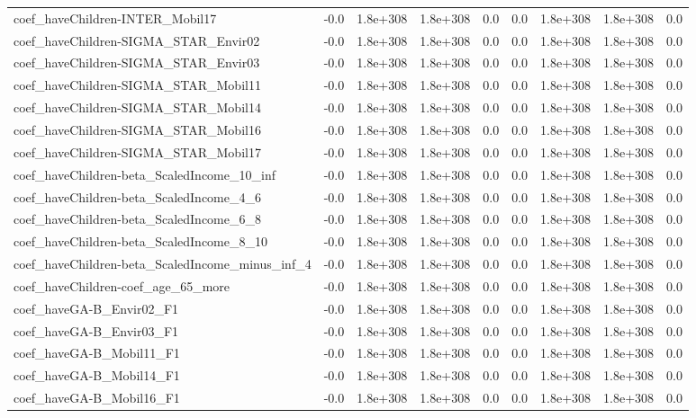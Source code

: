 \begin{tabular}{lrrrrrrrr}
coef_haveChildren-INTER_Mobil17 & -0.0 & 1.8e+308 & 1.8e+308 & 0.0 & 0.0 & 1.8e+308 & 1.8e+308 & 0.0 \\
coef_haveChildren-SIGMA_STAR_Envir02 & -0.0 & 1.8e+308 & 1.8e+308 & 0.0 & 0.0 & 1.8e+308 & 1.8e+308 & 0.0 \\
coef_haveChildren-SIGMA_STAR_Envir03 & -0.0 & 1.8e+308 & 1.8e+308 & 0.0 & 0.0 & 1.8e+308 & 1.8e+308 & 0.0 \\
coef_haveChildren-SIGMA_STAR_Mobil11 & -0.0 & 1.8e+308 & 1.8e+308 & 0.0 & 0.0 & 1.8e+308 & 1.8e+308 & 0.0 \\
coef_haveChildren-SIGMA_STAR_Mobil14 & -0.0 & 1.8e+308 & 1.8e+308 & 0.0 & 0.0 & 1.8e+308 & 1.8e+308 & 0.0 \\
coef_haveChildren-SIGMA_STAR_Mobil16 & -0.0 & 1.8e+308 & 1.8e+308 & 0.0 & 0.0 & 1.8e+308 & 1.8e+308 & 0.0 \\
coef_haveChildren-SIGMA_STAR_Mobil17 & -0.0 & 1.8e+308 & 1.8e+308 & 0.0 & 0.0 & 1.8e+308 & 1.8e+308 & 0.0 \\
coef_haveChildren-beta_ScaledIncome_10_inf & -0.0 & 1.8e+308 & 1.8e+308 & 0.0 & 0.0 & 1.8e+308 & 1.8e+308 & 0.0 \\
coef_haveChildren-beta_ScaledIncome_4_6 & -0.0 & 1.8e+308 & 1.8e+308 & 0.0 & 0.0 & 1.8e+308 & 1.8e+308 & 0.0 \\
coef_haveChildren-beta_ScaledIncome_6_8 & -0.0 & 1.8e+308 & 1.8e+308 & 0.0 & 0.0 & 1.8e+308 & 1.8e+308 & 0.0 \\
coef_haveChildren-beta_ScaledIncome_8_10 & -0.0 & 1.8e+308 & 1.8e+308 & 0.0 & 0.0 & 1.8e+308 & 1.8e+308 & 0.0 \\
coef_haveChildren-beta_ScaledIncome_minus_inf_4 & -0.0 & 1.8e+308 & 1.8e+308 & 0.0 & 0.0 & 1.8e+308 & 1.8e+308 & 0.0 \\
coef_haveChildren-coef_age_65_more & -0.0 & 1.8e+308 & 1.8e+308 & 0.0 & 0.0 & 1.8e+308 & 1.8e+308 & 0.0 \\
coef_haveGA-B_Envir02_F1 & -0.0 & 1.8e+308 & 1.8e+308 & 0.0 & 0.0 & 1.8e+308 & 1.8e+308 & 0.0 \\
coef_haveGA-B_Envir03_F1 & -0.0 & 1.8e+308 & 1.8e+308 & 0.0 & 0.0 & 1.8e+308 & 1.8e+308 & 0.0 \\
coef_haveGA-B_Mobil11_F1 & -0.0 & 1.8e+308 & 1.8e+308 & 0.0 & 0.0 & 1.8e+308 & 1.8e+308 & 0.0 \\
coef_haveGA-B_Mobil14_F1 & -0.0 & 1.8e+308 & 1.8e+308 & 0.0 & 0.0 & 1.8e+308 & 1.8e+308 & 0.0 \\
coef_haveGA-B_Mobil16_F1 & -0.0 & 1.8e+308 & 1.8e+308 & 0.0 & 0.0 & 1.8e+308 & 1.8e+308 & 0.0 \\

\end{tabular}
